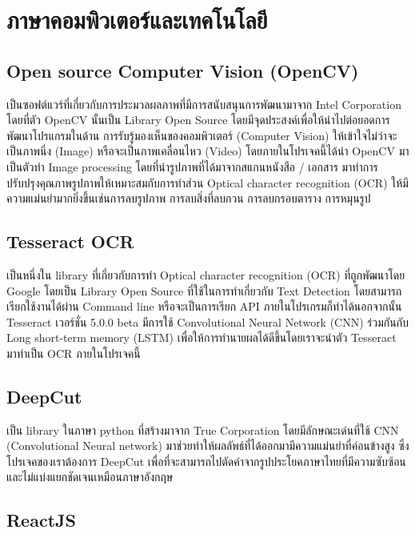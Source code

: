 \section{ภาษาคอมพิวเตอร์และเทคโนโลยี }

\subsection{Open source Computer Vision (OpenCV)}

เป็นซอฟต์แวร์ที่เกี่ยวกับการประมวลผลภาพที่มีการสนับสนุนการพัฒนามาจาก Intel Corporation โดยที่ตัว OpenCV นั้นเป็น Library Open Source  โดยมีจุดประสงค์เพื่อให้นำไปต่อยอดการพัฒนาโปรแกรมในด้าน การรับรู้มองเห็นของคอมพิวเตอร์ (Computer Vision) ให้เข้าใจไม่ว่าจะเป็นภาพนิ่ง (Image) หรือจะเป็นภาพเคลื่อนไหว (Video) โดยภายในโปรเจคนี้ได้นำ OpenCV มาเป็นตัวทำ Image processing โดยที่นำรูปภาพที่ได้มาจากสแกนหนังสือ / เอกสาร มาทำการปรับปรุงคุณภาพรูปภาพให้เหมาะสมกับการทำส่วน Optical character recognition (OCR) ให้มีความแม่นยำมากยิ่งขึ้นเช่นการลบรูปภาพ การลบสิ่งที่ลบกวน การลบกรอบตาราง การหมุนรูป 

\subsection{Tesseract OCR}

เป็นหนึ่งใน library ที่เกี่ยวกับการทำ Optical character recognition (OCR) ที่ถูกพัฒนาโดย Google โดยเป็น Library Open Source ที่ใช้ในการทำเกี่ยวกับ Text Detection โดยสามารถเรียกใช้งานได้ผ่าน Command line หรือจะเป็นการเรียก API ภายในโปรเกรมก็ทำได้นอกจากนั้น Tesseract เวอร์ชั่น 5.0.0 beta มีการใช้ Convolutional Neural Network (CNN) \cite{keiron} ร่วมกันกับ Long short-term memory (LSTM) เพื่อให้การทำนายผลได้ดีขึ้นโดยเราจะนำตัว Tesseract มาทำเป็น OCR ภายในโปรเจคนี้

\subsection{DeepCut}

เป็น library ในภาษา python ที่สร้างมาจาก True Corporation โดยมีลักษณะเด่นที่ใช้ CNN (Convolutional Neural network) \cite{keiron} มาช่วยทำให้ผลลัพธ์ที่ได้ออกมามีความแม่นยำที่ค่อนข้างสูง  ซึ่งโปรเจคของเราต้องการ DeepCut เพื่อที่จะสามารถไปตัดคำจากรูปประโยคภาษาไทยที่มีความซับซ้อน และไม่แบ่งแยกชัดเจนเหมือนภาษาอังกฤษ 

\subsection{ReactJS}

